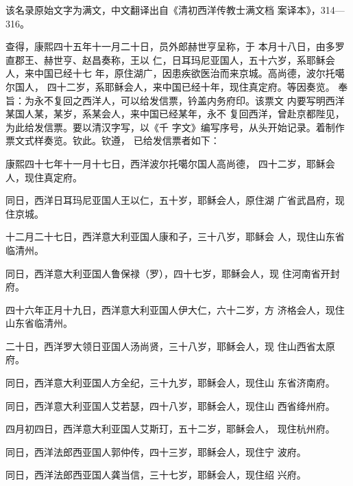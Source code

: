 \par
该名录原始文字为满文，中文翻译出自《清初西洋传教士满文档%
案译本》，314—316。%
\par
{\bookkai 查得，康熙四十五年十一月二十日，员外郎赫世亨呈称，于}%
{\bookkai 本月十八日，由多罗直郡王、赫世亨、赵昌奏称，王以}%
{\bookkai 仁，日耳玛尼亚国人，五十六岁，系耶稣会人，来中国已经十七}%
{\bookkai 年，原住湖广，因患疾欲医治而来京城。高尚德，波尔托噶尔国人，}%
{\bookkai 四十二岁，系耶稣会人，来中国已经十年，现住真定府。等因奏览。}%
{\bookkai 奉旨：为永不复回之西洋人，可以给发信票，钤盖内务府印。该票文}%
{\bookkai 内要写明西洋某国人某，某岁，系某会人，来中国已经某年，永不}%
{\bookkai 复回西洋，曾赴京都陛见，为此给发信票。要以清汉字写，以《千}%
{\bookkai 字文》编写序号，从头开始记录。着制作票文式样奏览。钦此。钦遵，}%
{\bookkai 已给发信票者如下：}%
\par
康熙四十七年十一月十七日，西洋波尔托噶尔国人高尚德，%
四十二岁，耶稣会人，现住真定府。%
\par
同日，西洋日耳玛尼亚国人王以仁，五十岁，耶稣会人，原住湖%
广省武昌府，现住京城。%
\par
十二月二十七日，西洋意大利亚国人康和子，三十八岁，耶稣会%
人，现住山东省临清州。%
\par
同日，西洋意大利亚国人鲁保禄（罗），四十七岁，耶稣会人，现%
住河南省开封府。%
\par
四十六年正月十九日，西洋意大利亚国人伊大仁，六十二岁，方%
济格会人，现住山东省临清州。%
\par
二十日，西洋罗大领日亚国人汤尚贤，三十八岁，耶稣会人，现%
住山西省太原府。%
\par
同日，西洋意大利亚国人方全纪，三十九岁，耶稣会人，现住山%
东省济南府。%
\par
同日，西洋意大利亚国人艾若瑟，四十八岁，耶稣会人，现住山%
西省绛州府。%
\par
四月初四日，西洋意大利亚国人艾斯玎，五十二岁，耶稣会人，%
现住杭州府。%
\par
同日，西洋法郎西亚国人郭仲传，四十三岁，耶稣会人，现住宁%
波府。%
\par
同日，西洋法郎西亚国人龚当信，三十七岁，耶稣会人，现住绍%
兴府。%
\par
